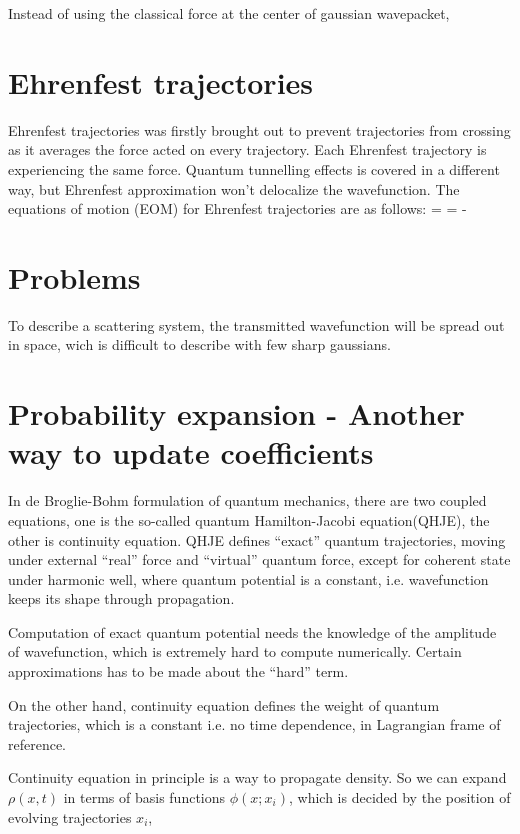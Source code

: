 \documentclass[11pt]{article}
\begin{document}
Instead of using the classical force at the center of gaussian wavepacket, 


\newpage
\section{Ehrenfest trajectories}
Ehrenfest trajectories was firstly brought out to prevent trajectories from crossing as it averages the force acted on every 
trajectory. Each Ehrenfest trajectory is experiencing the same force. Quantum tunnelling effects is covered in a different way, 
but Ehrenfest approximation won't delocalize the wavefunction.
The equations of motion (EOM) for Ehrenfest trajectories are as follows:
\be {} =  \ee 
\be {} = \bra - \ket \ee 


\section{Problems}
To describe a scattering system, the transmitted wavefunction will be spread out in space, wich is difficult to describe with few sharp gaussians.  

\section{Probability expansion - Another way to update coefficients}
In de Broglie-Bohm formulation of quantum mechanics, there are two coupled equations, one is the so-called quantum Hamilton-Jacobi equation(QHJE), the other is continuity equation. 
QHJE defines ``exact'' quantum trajectories, moving under external ``real'' force and  ``virtual'' quantum force, except for coherent state under harmonic well, where quantum potential is a constant, i.e. wavefunction keeps its shape through propagation. 

Computation of exact quantum potential needs the knowledge of the amplitude of wavefunction, which is extremely hard to compute numerically. Certain approximations has to be made about the ``hard'' term. 

On the other hand, continuity equation defines the weight of quantum trajectories, which is a constant i.e. no time dependence,  in Lagrangian frame of reference.  

Continuity equation in principle is a way to propagate density. So we can expand $\rho(x,t)$ in terms of basis functions $\phi(x;x_i)$, which is decided by the position of evolving trajectories $x_i$,
\end{document}
